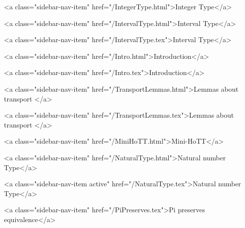           <a class="sidebar-nav-item" href="/IntegerType.html">Integer Type</a>
        
      
    
      
        
          <a class="sidebar-nav-item" href="/IntervalType.html">Interval Type</a>
        
      
    
      
        
          <a class="sidebar-nav-item" href="/IntervalType.tex">Interval Type</a>
        
      
    
      
        
          <a class="sidebar-nav-item" href="/Intro.html">Introduction</a>
        
      
    
      
        
          <a class="sidebar-nav-item" href="/Intro.tex">Introduction</a>
        
      
    
      
        
          <a class="sidebar-nav-item" href="/TransportLemmas.html">Lemmas about transport </a>
        
      
    
      
        
          <a class="sidebar-nav-item" href="/TransportLemmas.tex">Lemmas about transport </a>
        
      
    
      
        
          <a class="sidebar-nav-item" href="/MiniHoTT.html">Mini-HoTT</a>
        
      
    
      
        
          <a class="sidebar-nav-item" href="/NaturalType.html">Natural number Type</a>
        
      
    
      
        
          <a class="sidebar-nav-item active" href="/NaturalType.tex">Natural number Type</a>
        
      
    
      
        
          <a class="sidebar-nav-item" href="/PiPreserves.tex">Pi preserves equivalence</a>
        
      
    
      
        
